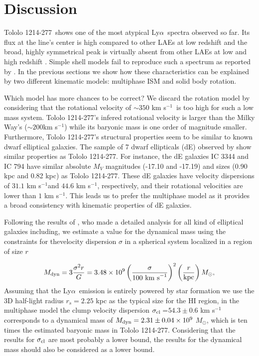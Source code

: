 \documentclass[a4,useAMS,usenatbib,usegraphicx]{mn2e}
\newcommand{\tol}{Tololo 1214-277}
\newcommand{\lya}{Ly$\alpha$}
\newcommand{\kms}{km s$^{-1}$}
\newcommand{\sigmaclump}{$54.3\pm 0.6$ km s$^{-1}$}
\begin{document}
\section{Discussion}

\tol\ shows one of the most atypical \lya\ spectra observed so far.
Its flux at the line's center is high compared to other LAEs at low
redshift and the broad, highly symmetrical peak is virtually absent from other
LAEs at low and high redshift
\citep{2012ApJ...751...29Y,LARS,Erb14,Trainor16}. 
Simple shell models
fail to reproduce such a spectrum as reported by \cite{2015A&A...578A...7V}.  
In the previous sections we show how these characteristics can be
explained by two different kinematic models: multiphase ISM and solid
body rotation.

Which model has more
chances to be correct?  
We discard the rotation model by considering that the rotational
velocity of $\sim350$ \kms\ is too high for such a low
mass system. 
\tol's infered rotational velocity is larger than the
Milky Way's ($\sim200$\kms) while its baryonic mass is one order
of magnitude smaller. 
Furthermore, \tol's structural properties seem to be similar to known dwarf
elliptical galaxies. 
The sample of 7 dwarf ellipticals (dE) observed by
\cite{2003AJ....126.1794G} show similar properties as \tol. 
For instance, the dE galaxies IC 3344 and IC 794 have similar absolute $M_V$
magnitudes (-17.10 and -17.19) and sizes (0.90 kpc and 0.82 kpc) as
\tol. 
These dE galaxies have velocity dispersions of $31.1$ \kms and
$44.6$ \kms, respectively,  and their rotational velocities are lower
than $1$ \kms.  
This leads us to prefer the multiphase model as it provides 
a broad consistency with kinematic properties of dE galaxies.

 
Following the results of \cite{2011ApJ...726..108T}, who made a
detailed analysis for all kind of elliptical galaxies including, we
estimate a value for the dynamical mass using the constraints for
thevelocity dispersion $\sigma$  in a spherical system localized in a
region of size $r$   


\begin{equation}
M_{\rm dyn} = 3 \frac{\sigma ^{2}r}{G} = 3.48\times10^{9}
\left(\frac{\sigma}{100\ \mathrm{km\ s}^{-1}}\right)^2\left(\frac{r}{\mathrm{kpc}}\right)
M_{\odot}, 
\end{equation}
%
Assuming that the \lya\ emission is entirely powered by star formation 
we use the 3D half-light radius $r_s=2.25$ kpc as the typical size
for the HI region, in the multiphase model the clump velocity dispersion
$\sigma_{\rm{cl}}=$\sigmaclump corresponds to a dynamical mass of
$M_{\rm dyn}=2.31\pm0.04 \times 10^{9}$ $M_{\odot}$, which is ten
times the estimated baryonic mass in \tol.
Considering that the results for $\sigma_{\rm{cl}}$ are most probably
a lower bound, the results for the dynamical mass should also be
considered as a lower bound. 
\end{document}
